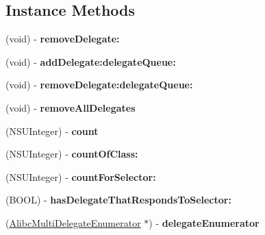 \subsection*{Instance Methods}
\begin{DoxyCompactItemize}
\item 
\mbox{\label{interface_alibc_multi_delegates_a4066c2cd28a010847f26bb1b63c19ac7}} 
(void) -\/ {\bfseries remove\+Delegate\+:}
\item 
\mbox{\label{interface_alibc_multi_delegates_a52ed561ab5a87e2ac217d678b19f1964}} 
(void) -\/ {\bfseries add\+Delegate\+:delegate\+Queue\+:}
\item 
\mbox{\label{interface_alibc_multi_delegates_a0dfa5c578e684fd1cd58a9bcf151f91e}} 
(void) -\/ {\bfseries remove\+Delegate\+:delegate\+Queue\+:}
\item 
\mbox{\label{interface_alibc_multi_delegates_a6c16e0c8d733371cfec65f07edfc696b}} 
(void) -\/ {\bfseries remove\+All\+Delegates}
\item 
\mbox{\label{interface_alibc_multi_delegates_a4d1ee77ccf0f5b84444ecf4b0b2bf051}} 
(N\+S\+U\+Integer) -\/ {\bfseries count}
\item 
\mbox{\label{interface_alibc_multi_delegates_a0135d516529b4b13c4edf490ca41f843}} 
(N\+S\+U\+Integer) -\/ {\bfseries count\+Of\+Class\+:}
\item 
\mbox{\label{interface_alibc_multi_delegates_a42f7adb291c30f869cd3e4a48d16009c}} 
(N\+S\+U\+Integer) -\/ {\bfseries count\+For\+Selector\+:}
\item 
\mbox{\label{interface_alibc_multi_delegates_a787ba15336c5fce0913101667e5be5c1}} 
(B\+O\+OL) -\/ {\bfseries has\+Delegate\+That\+Responds\+To\+Selector\+:}
\item 
\mbox{\label{interface_alibc_multi_delegates_a231ce027b1b4fb9e3572ab8e95cd83d2}} 
(\mbox{\hyperlink{interface_alibc_multi_delegate_enumerator}{Alibc\+Multi\+Delegate\+Enumerator}} $\ast$) -\/ {\bfseries delegate\+Enumerator}
\end{DoxyCompactItemize}
